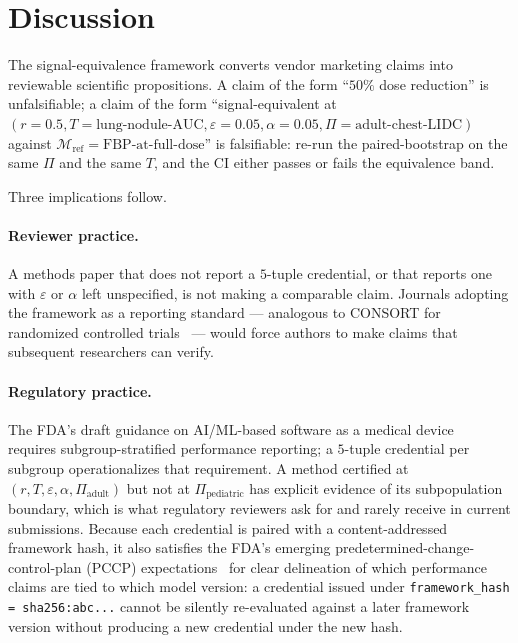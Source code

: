 \documentclass[twoside,11pt]{article}
\newcommand{\Mref}{\mathcal{M}_{\textrm{ref}}}
\begin{document}
\section{Discussion}

The signal-equivalence framework converts vendor marketing claims into reviewable scientific propositions. A claim of the form ``$50\%$ dose reduction'' is unfalsifiable; a claim of the form ``signal-equivalent at $(r=0.5, T=\textrm{lung-nodule-AUC}, \varepsilon=0.05, \alpha=0.05, \Pi=\textrm{adult-chest-LIDC})$ against $\Mref = \textrm{FBP-at-full-dose}$'' is falsifiable: re-run the paired-bootstrap on the same $\Pi$ and the same $T$, and the CI either passes or fails the equivalence band.

Three implications follow.

\paragraph{Reviewer practice.} A methods paper that does not report a $5$-tuple credential, or that reports one with $\varepsilon$ or $\alpha$ left unspecified, is not making a comparable claim. Journals adopting the framework as a reporting standard --- analogous to CONSORT for randomized controlled trials~\citep{schulz2010consort} --- would force authors to make claims that subsequent researchers can verify.

\paragraph{Regulatory practice.} The FDA's draft guidance on AI/ML-based software as a medical device~\citep{fda_aiml_2024} requires subgroup-stratified performance reporting; a $5$-tuple credential per subgroup operationalizes that requirement. A method certified at $(r, T, \varepsilon, \alpha, \Pi_{\textrm{adult}})$ but not at $\Pi_{\textrm{pediatric}}$ has explicit evidence of its subpopulation boundary, which is what regulatory reviewers ask for and rarely receive in current submissions. Because each credential is paired with a content-addressed framework hash, it also satisfies the FDA's emerging predetermined-change-control-plan (PCCP) expectations~\citep{fda_aiml_2024} for clear delineation of which performance claims are tied to which model version: a credential issued under \texttt{framework\_hash = sha256:abc...} cannot be silently re-evaluated against a later framework version without producing a new credential under the new hash.
\end{document}
